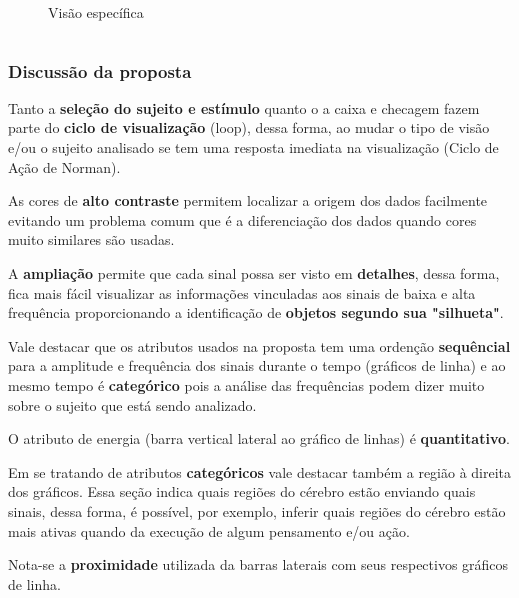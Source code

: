 \begin{frame}
\begin{columns}
\begin{column}{0.66\textwidth}
{\begin{figure}
					\caption{Visão específica}
					\label{fig:g3762}
				\end{figure}
			}
		\end{column}
	\end{columns}
\end{frame}
\begin{frame}[allowframebreaks]
	\frametitle{Discussão da proposta}
	\par Tanto a \textbf{seleção do sujeito e estímulo} quanto o a caixa e checagem fazem parte do \textbf{ciclo de visualização} (loop), dessa forma, ao mudar o tipo de visão e/ou o sujeito analisado se tem uma resposta imediata na visualização (Ciclo de Ação de Norman).\newline
	
	\par As cores de \textbf{alto contraste} permitem localizar a origem dos dados facilmente evitando um problema comum que é a diferenciação dos dados quando cores muito similares são usadas.\newline
	
	\par A \textbf{ampliação} permite que cada sinal possa ser visto em \textbf{detalhes}, dessa forma, fica mais fácil visualizar as informações vinculadas aos sinais de baixa e alta frequência proporcionando a identificação de \textbf{objetos segundo sua "silhueta"}.\newline
	
	\par Vale destacar que os atributos usados na proposta tem uma ordenção \textbf{sequêncial} para a amplitude e frequência dos sinais durante o tempo (gráficos de linha) e ao mesmo tempo é \textbf{categórico} pois a análise das frequências podem dizer muito sobre o sujeito que está sendo analizado.\newline
	\par O atributo de energia (barra vertical lateral ao gráfico de linhas) é \textbf{quantitativo}.\newline
	
	\par Em se tratando de atributos \textbf{categóricos} vale destacar também a região à direita dos gráficos. Essa seção indica quais regiões do cérebro estão enviando quais sinais, dessa forma, é possível, por exemplo, inferir quais regiões do cérebro estão mais ativas quando da execução de algum pensamento e/ou ação.\newline
	
	\par Nota-se a \textbf{proximidade} utilizada da barras laterais com seus respectivos gráficos de linha.\newline
	

\end{frame}
